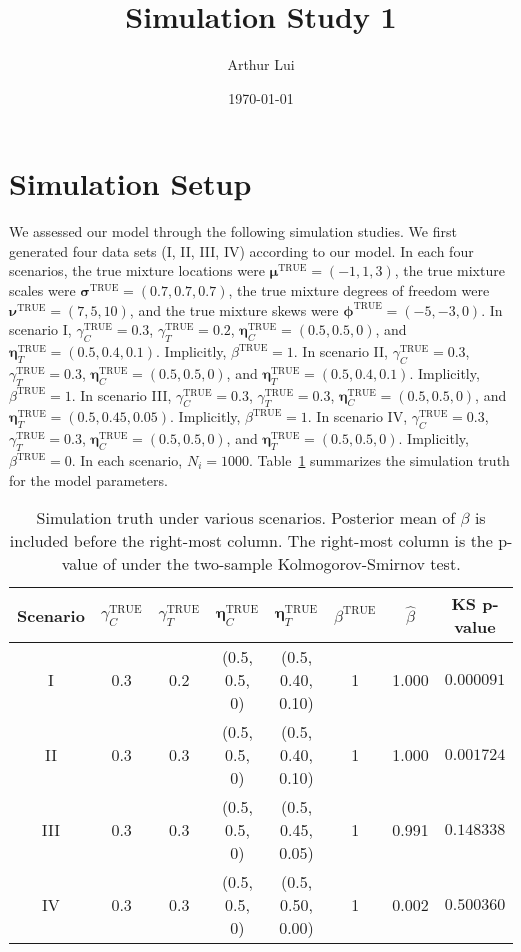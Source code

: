 \documentclass[12pt]{article} %
\title{Simulation Study 1}
\author{Arthur Lui}
\date{\today} %
\newcommand{\true}{\text{TRUE}}
\begin{document}
\maketitle

\section{Simulation Setup}\label{sec:sim-setup}
We assessed our model through the following simulation studies. We first
generated four data sets (I, II, III, IV) according to our model. In each
four scenarios,
%
the true mixture locations were $\bm{\mu}^\true=(-1, 1, 3)$,
the true mixture scales were $\bm{\sigma}^\true=(0.7, 0.7, 0.7)$,
the true mixture degrees of freedom were $\bm{\nu}^\true=(7, 5, 10)$, and
the true mixture skews were $\bm{\phi}^\true=(-5, -3, 0)$.
%
In scenario I, $\gamma_C^\true=0.3$, $\gamma_T^\true=0.2$, $\bm\eta_C^\true=(0.5,
0.5, 0)$, and $\bm\eta_T^\true=(0.5,0.4,0.1)$. Implicitly, $\beta^\true=1$.
In scenario II, $\gamma_C^\true=0.3$, $\gamma_T^\true=0.3$, $\bm\eta_C^\true=(0.5,
0.5, 0)$, and $\bm\eta_T^\true=(0.5,0.4,0.1)$. Implicitly, $\beta^\true=1$.
In scenario III, $\gamma_C^\true=0.3$, $\gamma_T^\true=0.3$, $\bm\eta_C^\true=(0.5,
0.5, 0)$, and $\bm\eta_T^\true=(0.5,0.45,0.05)$. Implicitly, $\beta^\true=1$.
In scenario IV, $\gamma_C^\true=0.3$, $\gamma_T^\true=0.3$, $\bm\eta_C^\true=(0.5,
0.5, 0)$, and $\bm\eta_T^\true=(0.5,0.5,0)$. Implicitly, $\beta^\true=0$.
%
In each scenario, $N_i=1000$. Table~\ref{tab:sim-truth} summarizes the
simulation truth for the model parameters.
\begin{table}
  \centering
  \begin{tabular}{|c|ccccccc|}
    \hline 
    Scenario & $\gamma_C^\true$ & $\gamma_T^\true$ & $\bm\eta_C^\true$ & 
    $\bm\eta_T^\true$ & $\beta^\true$ & $\hat\beta$ & KS p-value \\
    \hline 
    I   & 0.3 & 0.2 & (0.5, 0.5, 0) & (0.5, 0.40, 0.10) & 1 & 1.000 & $0.000091$ \\
    II  & 0.3 & 0.3 & (0.5, 0.5, 0) & (0.5, 0.40, 0.10) & 1 & 1.000 & $0.001724$ \\
    III & 0.3 & 0.3 & (0.5, 0.5, 0) & (0.5, 0.45, 0.05) & 1 & 0.991 & $0.148338$ \\
    IV  & 0.3 & 0.3 & (0.5, 0.5, 0) & (0.5, 0.50, 0.00) & 1 & 0.002 & $0.500360$ \\
    \hline
  \end{tabular}
  \caption{Simulation truth under various scenarios. Posterior mean of
  $\beta$ is included before the right-most column. The right-most column
  is the p-value of under the two-sample Kolmogorov-Smirnov test.}
  \label{tab:sim-truth}
\end{table}
\end{document}
